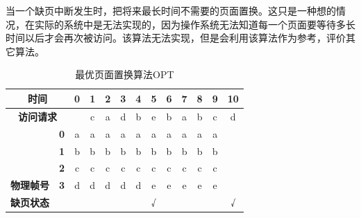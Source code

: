 当一个缺页中断发生时，把将来最长时间不需要的页面置换。这只是一种想的情况，在实际的系统中是无法实现的，因为操作系统无法知道每一个页面要等待多长时间以后才会再次被访问。该算法无法实现，但是会利用该算法作为参考，评价其它算法。

\begin{table}[H]
    \centering
    \begin{tabular}{|clc|c|c|c|c|c|c|c|c|c|c|c|}
        \hline
        \multicolumn{3}{|c|}{\textbf{时间}}                       & \textbf{0} & \textbf{1} & \textbf{2}               & \textbf{3}               & \textbf{4}               & \textbf{5}               & \textbf{6}               & \textbf{7}               & \textbf{8}               & \textbf{9}               & \textbf{10}                  \\ \hline
        \multicolumn{3}{|c|}{\textbf{访问请求}}                   &            & c          & a                        & d                        & b                        & e                        & b                        & a                        & b                        & c                        & d                            \\ \hline
        \multicolumn{2}{|c|}{}                                    & \textbf{0} & a          & a                        & {\color[HTML]{FE0000} a} & a                        & a                        & a                        & a                        & {\color[HTML]{FE0000} a} & a                        & a                        &   \\ \cline{3-14}
        \multicolumn{2}{|c|}{}                                    & \textbf{1} & b          & b                        & b                        & b                        & {\color[HTML]{FE0000} b} & b                        & {\color[HTML]{FE0000} b} & b                        & {\color[HTML]{FE0000} b} & b                        &   \\ \cline{3-14}
        \multicolumn{2}{|c|}{}                                    & \textbf{2} & c          & {\color[HTML]{FE0000} c} & c                        & c                        & c                        & c                        & c                        & c                        & c                        & {\color[HTML]{FE0000} c} &   \\ \cline{3-14}
        \multicolumn{2}{|c|}{\multirow{-4}{*}{\textbf{物理帧号}}} & \textbf{3} & d          & d                        & d                        & {\color[HTML]{FE0000} d} & d                        & {\color[HTML]{FE0000} e} & e                        & e                        & e                        & e                        &   \\ \hline
        \multicolumn{2}{|c|}{\textbf{缺页状态}}                   &            &            &                          &                          &                          &                          & √                        &                          &                          &                          &                          & √ \\ \hline
    \end{tabular}
    \caption{最优页面置换算法OPT}
\end{table}

